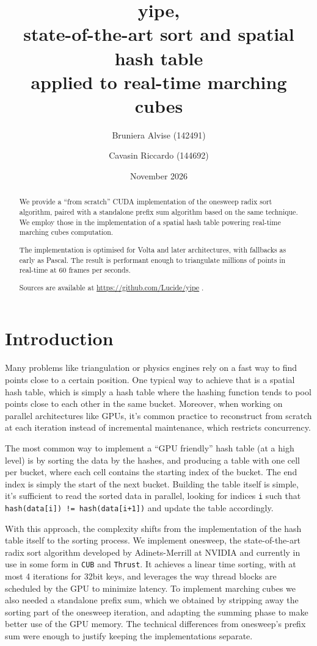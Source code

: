 \documentclass[a4paper]{report}
\title{yipe,\\
state-of-the-art sort and spatial hash table\\
applied to real-time marching cubes}
\author{Bruniera Alvise (142491) \and Cavasin Riccardo (144692)}
\date{November 2026}
\newcommand{\ones}{onesweep\xspace}
\begin{document}
\maketitle

\begin{abstract}
We provide a ``from scratch'' CUDA implementation of the \ones \cite{adinets2022onesweep} radix sort algorithm, paired with a standalone prefix sum algorithm based on the same technique. We employ those in the implementation of a spatial hash table powering real-time marching cubes \cite{bourke1994polygonising} computation.

The implementation is optimised for Volta and later architectures, with fallbacks as early as Pascal. The result is performant enough to triangulate millions of points in real-time at 60 frames per seconds.

Sources are available at \url{https://github.com/Lucide/yipe} .
\end{abstract}

\tableofcontents

\newpage

\chapter{Introduction}

Many problems like triangulation or physics engines rely on a fast way to find points close to a certain position. One typical way to achieve that is a spatial hash table, which is simply a hash table where the hashing function tends to pool points close to each other in the same bucket. Moreover, when working on parallel architectures like GPUs, it's common practice to reconstruct from scratch at each iteration instead of incremental maintenance, which restricts concurrency.

The most common way to implement a ``GPU friendly'' hash table (at a high level) is by sorting the data by the hashes, and producing a table with one cell per bucket, where each cell contains the starting index of the bucket. The end index is simply the start of the next bucket. Building the table itself is simple, it's sufficient to read the sorted data in parallel, looking for indices \lstinline{i} such that \lstinline{hash(data[i]) != hash(data[i+1])} and update the table accordingly.

With this approach, the complexity shifts from the implementation of the hash table itself to the sorting process. We implement \ones \cite{adinets2022onesweep}, the state-of-the-art radix sort algorithm developed by Adinets-Merrill at NVIDIA and currently in use in some form in \lstinline{CUB} and \lstinline{Thrust}. It achieves a linear time sorting, with at most 4 iterations for 32bit keys, and leverages the way thread blocks are scheduled by the GPU to minimize latency. To implement marching cubes we also needed a standalone prefix sum, which we obtained by stripping away the sorting part of the \ones iteration, and adapting the summing phase to make better use of the GPU memory. The technical differences from \ones's prefix sum were enough to justify keeping the implementations separate.
\end{document}
